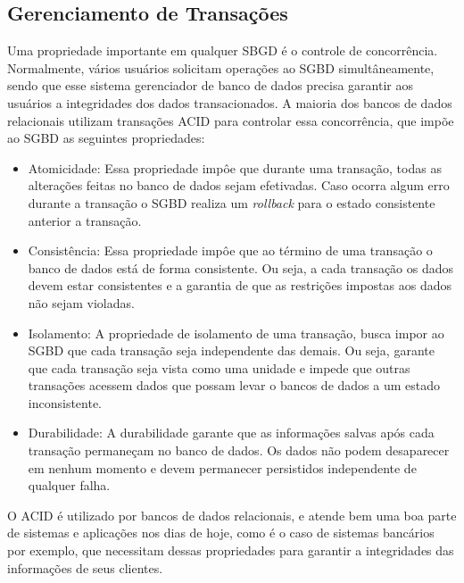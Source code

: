 \subsection{Gerenciamento de Transações} \label{manage_transaction}
	Uma propriedade importante em qualquer SBGD é o controle de concorrência. Normalmente, vários usuários solicitam operações ao SGBD simultâneamente, sendo que esse sistema gerenciador de banco de dados precisa garantir aos usuários a integridades dos dados transacionados. A maioria dos bancos de dados relacionais utilizam transações ACID\cite{SistemaDeBd} para controlar essa concorrência, que impõe ao SGBD as seguintes propriedades:
	\begin{itemize}
		\item Atomicidade: Essa propriedade impôe que durante uma transação, todas as alterações feitas no banco de dados sejam efetivadas. Caso ocorra algum erro durante a transação o SGBD realiza um \textit{rollback} para o estado consistente anterior a transação.
		\item Consistência: Essa propriedade impôe que ao término de uma transação o banco de dados está de forma consistente. Ou seja, a cada transação os dados devem estar consistentes e a garantia de que as restrições impostas aos dados não sejam violadas.
		\item Isolamento: A propriedade de isolamento de uma transação, busca impor ao SGBD que cada transação seja independente das demais. Ou seja, garante que cada transação seja vista como uma unidade e impede que outras transações acessem dados que possam levar o bancos de dados a um estado inconsistente. 
		\item Durabilidade: A durabilidade garante que as informações salvas após cada transação permaneçam no banco de dados. Os dados não podem desaparecer em nenhum momento e devem permanecer persistidos independente de qualquer falha.
	\end{itemize}
	
	O ACID é utilizado por bancos de dados relacionais, e atende bem uma boa parte de sistemas e aplicações nos dias de hoje, como é o caso de sistemas bancários por exemplo, que necessitam dessas propriedades para garantir a integridades das informações de seus clientes.
	
